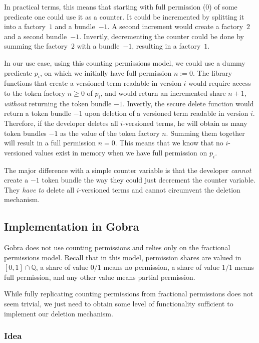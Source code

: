 In practical terms, this means that starting with full permission ($0$) of some predicate one could use it as a counter. It could be incremented by splitting it into a factory~$1$ and a bundle~$-1$. A second increment would create a factory~$2$ and a second bundle~$-1$. Invertly, decrementing the counter could be done by summing the factory~$2$ with a bundle~$-1$, resulting in a factory~$1$.

In our use case, using this counting permissions model, we could use a dummy predicate $p_i$, on which we initially have full permission $n:=0$. The library functions that create a versioned term readable in version $i$ would require access to the token factory $n\geq0$ of $p_i$, and would return an incremented share $n+1$, \emph{without} returning the token bundle $-1$. Invertly, the secure delete function would return a token bundle $-1$ upon deletion of a versioned term readable in version $i$. Therefore, if the developer deletes all $i$-versioned terms, he will obtain as many token bundles $-1$ as the value of the token factory $n$. Summing them together will result in a full permission $n = 0$. This means that we know that no $i$-versioned values exist in memory when we have full permission on $p_i$.

The major difference with a simple counter variable is that the developer \emph{cannot} create a $-1$ token bundle the way they could just decrement the counter variable. They \emph{have to} delete all $i$-versioned terms and cannot circumvent the deletion mechanism.

\subsection{Implementation in Gobra}
\label{sec:implementation-in-gobra}

Gobra does not use counting permissions and relies only on the fractional permissions model.
Recall that in this model, permission shares are valued in $[0,1]\cap\mathbb{Q}$, a share of value $0/1$ means no permission, a share of value $1/1$ means full permission, and any other value means partial permission.

While fully replicating counting permissions from fractional permissions does not seem trivial, we just need to obtain some level of functionality sufficient to implement our deletion mechanism.

\subsubsection{Idea}
\label{sec:counting-permissions-idea}


